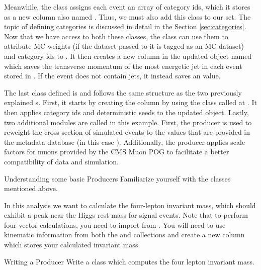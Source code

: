 Meanwhile, the  class assigns each event an array of category ids, which it stores as a new column also named . Thus, we must also add this class to our  set. The topic of defining categories is discussed in detail in the Section \ref{sec:categories}. Now that we have access to both these  classes, the  class can use them to attribute MC weights (if the dataset passed to it is tagged as an MC dataset) and category ids to . It then creates a new column in the updated  object named  which saves the transverse momentum of the most energetic jet in each event stored in . If the event does not contain jets, it instead saves an  value. 

The last  class defined is  and follows the same structure as the  two previously explained s.
First, it starts by creating the  column by using the  class  called at .
It then applies category ids and deterministic seeds to the updated  object.
Lastly, two additional modules are called in this example.
First, the  producer is used to reweight the cross section of simulated events to the values that are provided in the metadata database (in this case ).
Additionally, the  producer applies scale factors for muons provided by the CMS Muon POG to facilitate a better compatibility of data and simulation.

\begin{exercise}{Understanding some basic Producers}
	Familiarize yourself with the  classes mentioned above.
\end{exercise}

In this  analysis we want to calculate the four-lepton invariant mass, which should exhibit a peak near the Higgs rest mass for signal events.
Note that to perform four-vector calculations, you need to import  from .
You will need to use kinematic information from both the  and  collections and create a new column which stores your calculated invariant mass.

\begin{exercise}{Writing a Producer}{}
	Write a  class which computes the four lepton invariant mass. 
\end{exercise}
 

